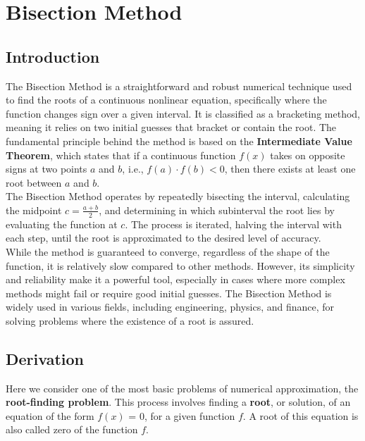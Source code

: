 \documentclass[12pt,a4paper]{article}
\begin{document}
	
	
	\section{\centering  Bisection Method}
	
	\subsection{ Introduction}
	
	 \fontsize{18pt}{18pt}\selectfont 
	 
	 	
	 	
	 	The Bisection Method is a straightforward and robust numerical technique used to find the roots of a continuous nonlinear equation, specifically where the function changes sign over a given interval. It is classified as a bracketing method, meaning it relies on two initial guesses that bracket or contain the root. The fundamental principle behind the method is based on the \textbf{Intermediate Value Theorem}, which states that if a continuous function \( f(x) \) takes on opposite signs at two points \( a \) and \( b \), i.e., \( f(a) \cdot f(b) < 0 \), then there exists at least one root between \( a \) and \( b \).\\
	 	
	 	The Bisection Method operates by repeatedly bisecting the interval, calculating the midpoint \( c = \frac{a+b}{2} \), and determining in which subinterval the root lies by evaluating the function at \( c \). The process is iterated, halving the interval with each step, until the root is approximated to the desired level of accuracy.\\
	 	
	 	While the method is guaranteed to converge, regardless of the shape of the function, it is relatively slow compared to other methods. However, its simplicity and reliability make it a powerful tool, especially in cases where more complex methods might fail or require good initial guesses. The Bisection Method is widely used in various fields, including engineering, physics, and finance, for solving problems where the existence of a root is assured.
	 
	\subsection{ Derivation} 
	
	Here we consider one of the most basic problems of numerical approximation, the \textbf{root-finding problem}. This process involves finding a \textbf{root}, or solution, of an equation of the form \(f(x)\) = 0, for a given function \(f\). A root of this equation is also called zero of the function \(f\).\\
	
\end{document}
